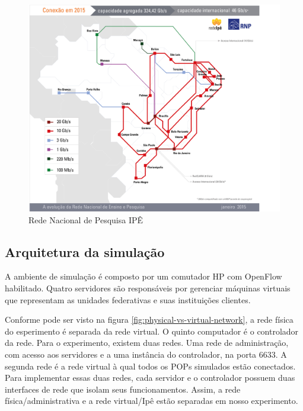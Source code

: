 \begin{figure}[!ht]
    \centering
    \label{fig:ipe-network-2015}
    \includegraphics[width=\textwidth]{img/ipe-network-2015}
    \caption{Rede Nacional de Pesquisa IPÊ \protect\footnotemark}
    \vspace*{3in}
\end{figure}


\subsection{Arquitetura da simulação}

A ambiente de simulação é composto por um comutador HP com OpenFlow habilitado.
Quatro servidores são responsáveis por gerenciar máquinas virtuais que 
representam as unidades federativas e suas instituições clientes.

Conforme pode ser visto na figura \ref{fig:physical-vs-virtual-network}, a
rede física do esperimento é separada da rede virtual.
O quinto computador é o controlador da rede. 
Para o experimento, existem duas redes. 
Uma rede de administração, com acesso aos servidores e a uma instância do 
controlador, na porta 6633.
A segunda rede é a rede virtual à qual todos os POPs simulados estão 
conectados. 
Para implementar essas duas redes, cada servidor e o controlador possuem duas
interfaces de rede que isolam seus funcionamentos.
Assim, a rede física/administrativa e a rede virtual/Ipê estão separadas
em nosso experimento.


